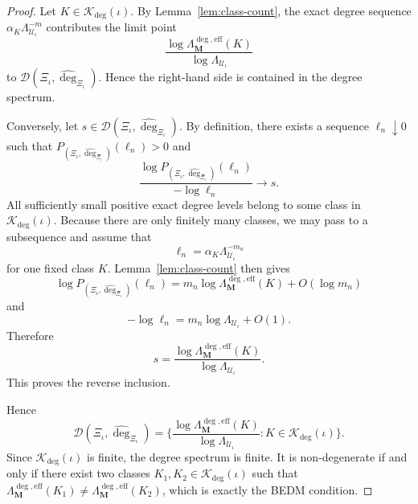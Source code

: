 \documentclass[12pt]{iopart}
\begin{document}
\begin{proof}
Let $K\in\mathscr K_{\deg}(\iota)$.
By Lemma~\ref{lem:class-count}, the exact degree sequence
$\alpha_K\Lambda_{\mathcal U_\iota}^{-m}$ contributes the limit point
\[
\frac{
\log \Lambda_{\mathbf M}^{\deg,\mathrm{eff}}(K)
}{
\log \Lambda_{\mathcal U_\iota}
}
\]
to $\mathscr D(\Xi_\iota,\hat{\deg}_{\Xi_\iota})$.
Hence the right-hand side is contained in the degree spectrum.

Conversely, let $s\in \mathscr D(\Xi_\iota,\hat{\deg}_{\Xi_\iota})$.
By definition, there exists a sequence $\ell_n\downarrow 0$ such that
$P_{(\Xi_\iota,\hat{\deg}_{\Xi_\iota})}(\ell_n)>0$ and
\[
\frac{
\log P_{(\Xi_\iota,\hat{\deg}_{\Xi_\iota})}(\ell_n)
}{
-\log \ell_n
}
\to s.
\]
All sufficiently small positive exact degree levels belong to some class in $\mathscr K_{\deg}(\iota)$.
Because there are only finitely many classes, we may pass to a subsequence and assume that
\[
\ell_n=\alpha_K\Lambda_{\mathcal U_\iota}^{-m_n}
\]
for one fixed class $K$.
Lemma~\ref{lem:class-count} then gives
\[
\log P_{(\Xi_\iota,\hat{\deg}_{\Xi_\iota})}(\ell_n)
=
m_n\log \Lambda_{\mathbf M}^{\deg,\mathrm{eff}}(K)+O(\log m_n)
\]
and
\[
-\log \ell_n
=
m_n\log \Lambda_{\mathcal U_\iota}+O(1).
\]
Therefore
\[
s
=
\frac{
\log \Lambda_{\mathbf M}^{\deg,\mathrm{eff}}(K)
}{
\log \Lambda_{\mathcal U_\iota}
}.
\]
This proves the reverse inclusion.

Hence
\[
\mathscr D(\Xi_\iota,\hat{\deg}_{\Xi_\iota})
=
\bigg\{
\frac{
\log \Lambda_{\mathbf M}^{\deg,\mathrm{eff}}(K)
}{
\log \Lambda_{\mathcal U_\iota}
}
:
K\in\mathscr K_{\deg}(\iota)
\bigg\}.
\]
Since $\mathscr K_{\deg}(\iota)$ is finite, the degree spectrum is finite.
It is non-degenerate if and only if there exist two classes
$K_1,K_2\in\mathscr K_{\deg}(\iota)$ such that
$\Lambda_{\mathbf M}^{\deg,\mathrm{eff}}(K_1)\ne \Lambda_{\mathbf M}^{\deg,\mathrm{eff}}(K_2)$, which is exactly the BEDM condition.
\end{proof}
\end{document}
